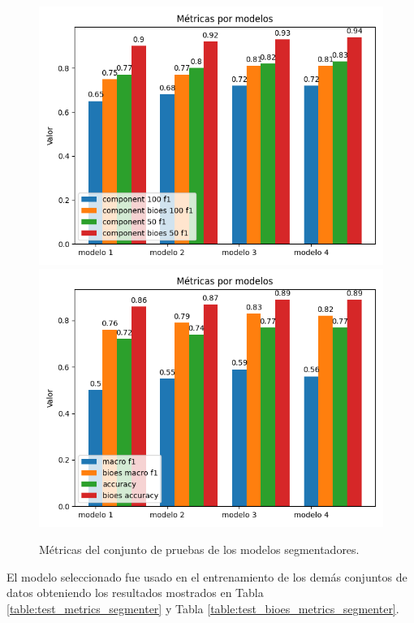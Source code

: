 \begin{figure}[h!]
	\begin{center}
		\includegraphics[scale=.4]{Graphics/persuasive_essays_all_linked_components.png}
		\includegraphics[scale=.4]{Graphics/persuasive_essays_all_linked_macro_micro_metrics.png}
	    \caption{Métricas del conjunto de pruebas de los modelos segmentadores.}\label{fig:test_segmenter_model_metrics}
	\end{center}
\end{figure}

El modelo seleccionado fue usado en el entrenamiento de los demás conjuntos de datos obteniendo los resultados mostrados
en Tabla \ref{table:test_metrics_segmenter} y Tabla \ref{table:test_bioes_metrics_segmenter}.

